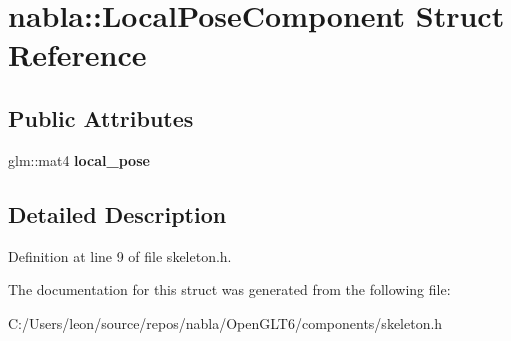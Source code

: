 \hypertarget{structnabla_1_1_local_pose_component}{}\section{nabla\+::Local\+Pose\+Component Struct Reference}
\label{structnabla_1_1_local_pose_component}
\subsection*{Public Attributes}
\begin{DoxyCompactItemize}
\item 
\mbox{\label{structnabla_1_1_local_pose_component_a82c2042902746a411f3d0f05fcfe2ef1}} 
glm\+::mat4 {\bfseries local\+\_\+pose}
\end{DoxyCompactItemize}


\subsection{Detailed Description}


Definition at line 9 of file skeleton.\+h.



The documentation for this struct was generated from the following file\+:\begin{DoxyCompactItemize}
\item 
C\+:/\+Users/leon/source/repos/nabla/\+Open\+G\+L\+T6/components/skeleton.\+h\end{DoxyCompactItemize}
